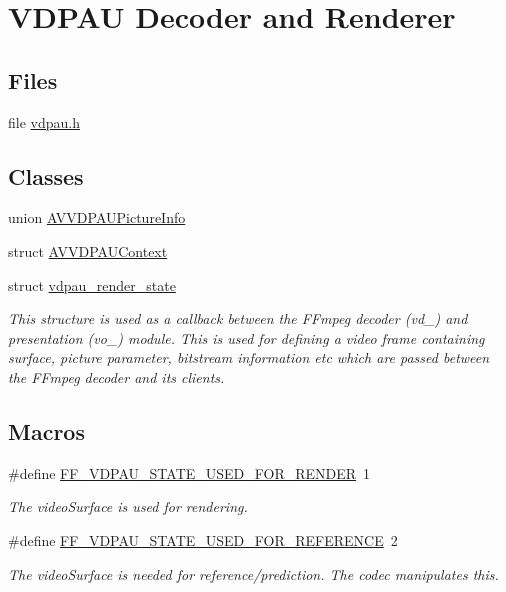 \hypertarget{group__lavc__codec__hwaccel__vdpau}{}\section{V\+D\+P\+AU Decoder and Renderer}
\label{group__lavc__codec__hwaccel__vdpau}
\subsection*{Files}
\begin{DoxyCompactItemize}
\item 
file \hyperlink{vdpau_8h}{vdpau.\+h}
\end{DoxyCompactItemize}
\subsection*{Classes}
\begin{DoxyCompactItemize}
\item 
union \hyperlink{union_a_v_v_d_p_a_u_picture_info}{A\+V\+V\+D\+P\+A\+U\+Picture\+Info}
\item 
struct \hyperlink{struct_a_v_v_d_p_a_u_context}{A\+V\+V\+D\+P\+A\+U\+Context}
\item 
struct \hyperlink{structvdpau__render__state}{vdpau\+\_\+render\+\_\+state}
\begin{DoxyCompactList}\small\item\em This structure is used as a callback between the F\+Fmpeg decoder (vd\+\_\+) and presentation (vo\+\_\+) module. This is used for defining a video frame containing surface, picture parameter, bitstream information etc which are passed between the F\+Fmpeg decoder and its clients. \end{DoxyCompactList}\end{DoxyCompactItemize}
\subsection*{Macros}
\begin{DoxyCompactItemize}
\item 
\#define \hyperlink{group__lavc__codec__hwaccel__vdpau_ga87551b42b8cc836804d9e0c5ac6fa367}{F\+F\+\_\+\+V\+D\+P\+A\+U\+\_\+\+S\+T\+A\+T\+E\+\_\+\+U\+S\+E\+D\+\_\+\+F\+O\+R\+\_\+\+R\+E\+N\+D\+ER}~1
\begin{DoxyCompactList}\small\item\em The video\+Surface is used for rendering. \end{DoxyCompactList}\item 
\#define \hyperlink{group__lavc__codec__hwaccel__vdpau_ga1f3b6a25961a335e3bb131428266d4a9}{F\+F\+\_\+\+V\+D\+P\+A\+U\+\_\+\+S\+T\+A\+T\+E\+\_\+\+U\+S\+E\+D\+\_\+\+F\+O\+R\+\_\+\+R\+E\+F\+E\+R\+E\+N\+CE}~2
\begin{DoxyCompactList}\small\item\em The video\+Surface is needed for reference/prediction. The codec manipulates this. \end{DoxyCompactList}\end{DoxyCompactItemize}
